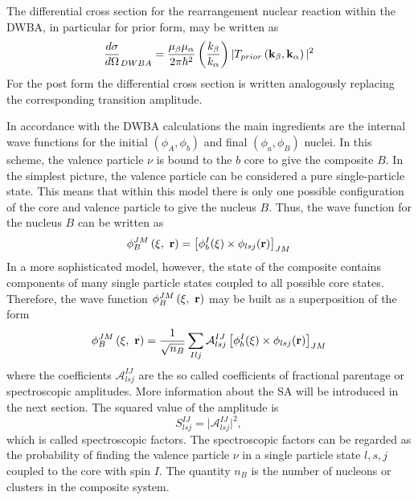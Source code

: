 \documentclass[
12pt, %
oneside, %
english, %
onehalfspacing, %
onehalfspacing, %
headsepline, %
]{MastersDoctoralThesis} %
\begin{document}
 The differential cross section for the rearrangement nuclear reaction within the DWBA, in particular for prior form, may be written as
 \begin{equation}
 \frac{d \sigma}{d \Omega}_{DWBA} = \frac{\mu_\beta \mu_\alpha}{2 \pi \hbar^2}
 \left( \frac{k_\beta}{k_\alpha}\right)
 \vert T_{prior} \left( {\bf k}_\beta, {\bf k}_\alpha \right) \vert^2
 \end{equation}
 For the post form the differential cross section is written analogously replacing the corresponding transition amplitude.
 
 In accordance with the DWBA calculations the main ingredients are the internal wave functions for the initial $\left( \phi_A, \phi_b \right)$ and final $\left( \phi_a, \phi_B \right)$ nuclei. 
 In this scheme, the valence particle $\nu$ is bound to the $b$ core to give the composite $B$.
In the simplest picture, the valence particle can be considered a pure single-particle state. 
This means that within this model there is only one possible configuration of the core and valence particle to give the nucleus $B$. Thus, the wave function for the nucleus $B$ can be written as
\begin{equation}
\phi^{JM}_B \left( \xi,~{\bf r} \right) = 
\left[ \phi_b^I (\xi)  \times \phi_{lsj} ({\bf r}) \right]_{JM}
\end{equation}
 In a more sophisticated model, however, the state of the composite contains components of many single particle states coupled to all possible core states.
 Therefore, the wave function $\phi^{JM}_B \left( \xi,~{\bf r} \right) $ may be built as a superposition of the form
 \begin{equation}
 \phi^{JM}_B \left( \xi,~{\bf r} \right)  =
 \frac{1}{\sqrt{n_B}}
 \sum_{Ilj} \mathcal{A}_{lsj}^{IJ} 
 \left[ \phi_b^I (\xi)  \times \phi_{lsj} ({\bf r}) \right]_{JM}
 \label{eq:composite_expansion}
 \end{equation}
 where the coefficients $\mathcal{A}_{lsj}^{IJ} $ are the so called coefficients of fractional parentage or spectroscopic amplitudes. 
 More information about the SA will be introduced in the next section. 
  The squared value of the amplitude is
 \begin{equation}
 S^{IJ}_{lsj} = \vert \mathcal{A}_{lsj}^{IJ}  \vert^2,
 \end{equation}
 which is called spectroscopic factors. 
 The spectroscopic factors can be regarded as the probability of finding the valence particle $\nu$ in a single particle state $l, s, j$ coupled to the core with spin $I$.
 The quantity $n_B$ is the number of nucleons or clusters in the composite system. 
 
\end{document}
